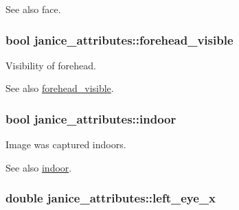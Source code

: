 \begin{DoxySeeAlso}{See also}
face. 
\end{DoxySeeAlso}
\hypertarget{structjanice__attributes_a1082879a8605238978f51c8ccc9bcbe9}{}
\subsubsection[{forehead\+\_\+visible}]{\setlength{\rightskip}{0pt plus 5cm}bool janice\+\_\+attributes\+::forehead\+\_\+visible}\label{structjanice__attributes_a1082879a8605238978f51c8ccc9bcbe9}


Visibility of forehead. 

\begin{DoxySeeAlso}{See also}
\hyperlink{structjanice__attributes_a1082879a8605238978f51c8ccc9bcbe9}{forehead\+\_\+visible}. 
\end{DoxySeeAlso}
\hypertarget{structjanice__attributes_a9376c226f494d7e061fca55850094798}{}
\subsubsection[{indoor}]{\setlength{\rightskip}{0pt plus 5cm}bool janice\+\_\+attributes\+::indoor}\label{structjanice__attributes_a9376c226f494d7e061fca55850094798}


Image was captured indoors. 

\begin{DoxySeeAlso}{See also}
\hyperlink{structjanice__attributes_a9376c226f494d7e061fca55850094798}{indoor}. 
\end{DoxySeeAlso}
\hypertarget{structjanice__attributes_a3a5899c504858558a08e8cc4d12eb15d}{}
\subsubsection[{left\+\_\+eye\+\_\+x}]{\setlength{\rightskip}{0pt plus 5cm}double janice\+\_\+attributes\+::left\+\_\+eye\+\_\+x}\label{structjanice__attributes_a3a5899c504858558a08e8cc4d12eb15d}


